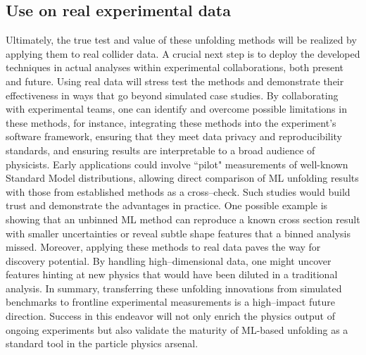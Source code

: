             \subsection{Use on real experimental data}
                Ultimately, the true test and value of these unfolding methods will be realized by applying them to real collider data.
                A crucial next step is to deploy the developed techniques in actual analyses within experimental collaborations, both present and future.
                Using real data will stress test the methods and demonstrate their effectiveness in ways that go beyond simulated case studies.
                By collaborating with experimental teams, one can identify and overcome possible limitations in these methods, for instance, integrating these methods into the experiment's software framework, ensuring that they meet data privacy and reproducibility standards, and ensuring results are interpretable to a broad audience of physicists.
                Early applications could involve ``pilot" measurements of well-known Standard Model distributions, allowing direct comparison of ML unfolding results with those from established methods as a cross--check.
                Such studies would build trust and demonstrate the advantages in practice.
                One possible example is showing that an unbinned ML method can reproduce a known cross section result with smaller uncertainties or reveal subtle shape features that a binned analysis missed.
                Moreover, applying these methods to real data paves the way for discovery potential.
                By handling high--dimensional data, one might uncover features hinting at new physics that would have been diluted in a traditional analysis.
                In summary, transferring these unfolding innovations from simulated benchmarks to frontline experimental measurements is a high--impact future direction.
                Success in this endeavor will not only enrich the physics output of ongoing experiments but also validate the maturity of ML-based unfolding as a standard tool in the particle physics arsenal.
